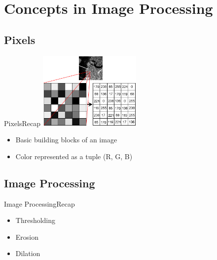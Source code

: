 \documentclass{beamer}
\begin{document}
\section{Concepts in Image Processing}
\subsection{Pixels}

\begin{frame}{Pixels}{Recap}
\centering
    \includegraphics[width=50mm]{images/pixel.png} 

\begin{itemize}
\item Basic building blocks of an image
\item Color represented as a tuple (R, G, B)
\end{itemize}
\end{frame}

\subsection{Image Processing}
\begin{frame}{Image Processing}{Recap}
\begin{itemize}
\item Thresholding
\item Erosion
\item Dilation
\end{itemize}
\end{frame}
\end{document}
